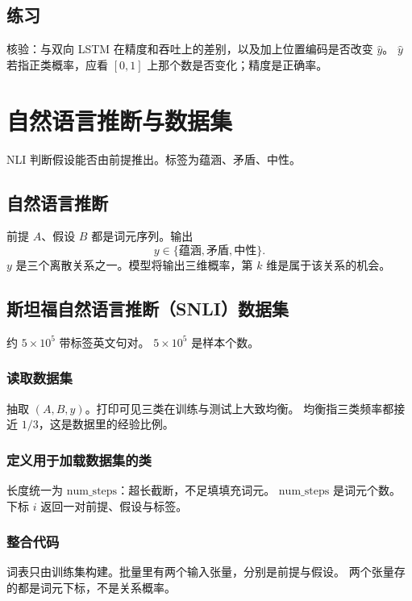 \subsection{练习}

核验：与双向 LSTM 在精度和吞吐上的差别，以及加上位置编码是否改变 $\hat y$。
$\hat y$ 若指正类概率，应看 $[0,1]$ 上那个数是否变化；精度是正确率。

\section{自然语言推断与数据集}

NLI 判断假设能否由前提推出。标签为蕴涵、矛盾、中性。

\subsection{自然语言推断}

前提 $A$、假设 $B$ 都是词元序列。输出
\[
y\in\{\text{蕴涵},\text{矛盾},\text{中性}\}.
\]
$y$ 是三个离散关系之一。模型将输出三维概率，第 $k$ 维是属于该关系的机会。

\subsection{斯坦福自然语言推断（SNLI）数据集}

约 $5\times 10^5$ 带标签英文句对。
$5\times 10^5$ 是样本个数。

\subsubsection{读取数据集}

抽取 $(A,B,y)$。打印可见三类在训练与测试上大致均衡。
均衡指三类频率都接近 $1/3$，这是数据里的经验比例。

\subsubsection{定义用于加载数据集的类}

长度统一为 $\mathrm{num\_steps}$：超长截断，不足填填充词元。
$\mathrm{num\_steps}$ 是词元个数。
下标 $i$ 返回一对前提、假设与标签。

\subsubsection{整合代码}

词表只由训练集构建。批量里有两个输入张量，分别是前提与假设。
两个张量存的都是词元下标，不是关系概率。

